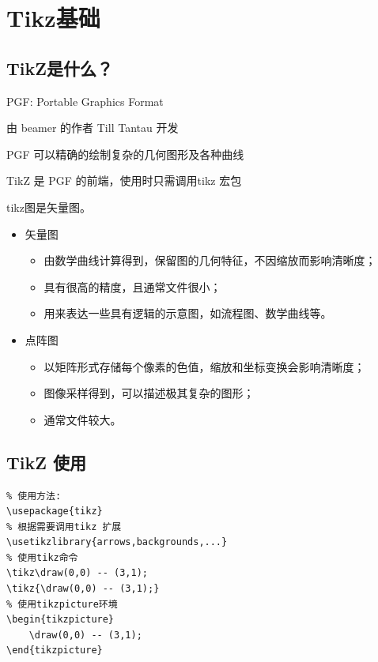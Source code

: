 \section{Tikz基础}
\subsection{TikZ是什么？}

PGF: Portable Graphics Format

由 beamer 的作者 Till Tantau 开发

PGF 可以精确的绘制复杂的几何图形及各种曲线

TikZ 是 PGF 的前端，使用时只需调用tikz 宏包

tikz图是矢量图。

\begin{itemize}
  \item 矢量图
    \begin{itemize}
      \item 由数学曲线计算得到，保留图的几何特征，不因缩放而影响清晰度；
      \item 具有很高的精度，且通常文件很小；
      \item 用来表达一些具有逻辑的示意图，如流程图、数学曲线等。
    \end{itemize}
  \item 点阵图
    \begin{itemize}
      \item 以矩阵形式存储每个像素的色值，缩放和坐标变换会影响清晰度；
      \item 图像采样得到，可以描述极其复杂的图形；%
      \item 通常文件较大。
    \end{itemize}
\end{itemize}

\subsection{TikZ 使用}




\begin{lstlisting}
% 使用方法:
\usepackage{tikz}
% 根据需要调用tikz 扩展
\usetikzlibrary{arrows,backgrounds,...}
% 使用tikz命令
\tikz\draw(0,0) -- (3,1);
\tikz{\draw(0,0) -- (3,1);}
% 使用tikzpicture环境
\begin{tikzpicture}
    \draw(0,0) -- (3,1);
\end{tikzpicture}
\end{lstlisting}

